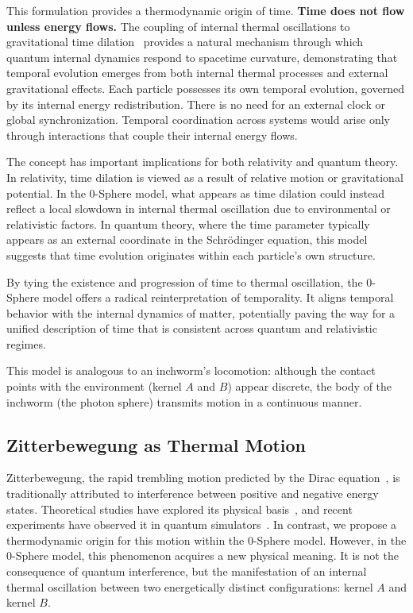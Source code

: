 \documentclass[%
 reprint,
 amsmath,amssymb,
 aps,
]{revtex4-1}
\numberwithin{equation}{section}%
\begin{document}
This formulation provides a thermodynamic origin of time. \textbf{Time does not flow unless energy flows.} The coupling of internal thermal oscillations to gravitational time dilation~\cite{hanamura2507.0033} provides a natural mechanism through which quantum internal dynamics respond to spacetime curvature, demonstrating that temporal evolution emerges from both internal thermal processes and external gravitational effects. Each particle possesses its own temporal evolution, governed by its internal energy redistribution. There is no need for an external clock or global synchronization. Temporal coordination across systems would arise only through interactions that couple their internal energy flows.

The concept has important implications for both relativity and quantum theory. In relativity, time dilation is viewed as a result of relative motion or gravitational potential. In the 0-Sphere model, what appears as time dilation could instead reflect a local slowdown in internal thermal oscillation due to environmental or relativistic factors. In quantum theory, where the time parameter typically appears as an external coordinate in the Schrödinger equation, this model suggests that time evolution originates within each particle’s own structure.

By tying the existence and progression of time to thermal oscillation, the 0-Sphere model offers a radical reinterpretation of temporality. It aligns temporal behavior with the internal dynamics of matter, potentially paving the way for a unified description of time that is consistent across quantum and relativistic regimes.

This model is analogous to an inchworm's locomotion: although the contact points with the environment (kernel $A$ and $B$) appear discrete, the body of the inchworm (the photon sphere) transmits motion in a continuous manner.


\subsection{Zitterbewegung as Thermal Motion}
\label{subsec:zitterbewegung_thermal}

Zitterbewegung, the rapid trembling motion predicted by the Dirac equation~\cite{dirac1928}, is traditionally attributed to interference between positive and negative energy states. Theoretical studies have explored its physical basis~\cite{barut1981, hestenes1990}, and recent experiments have observed it in quantum simulators~\cite{gerritsma2010, leblanc2013}. In contrast, we propose a thermodynamic origin for this motion within the 0-Sphere model. However, in the 0-Sphere model, this phenomenon acquires a new physical meaning. It is not the consequence of quantum interference, but the manifestation of an internal thermal oscillation between two energetically distinct configurations: kernel $A$ and kernel $B$.
\end{document}
